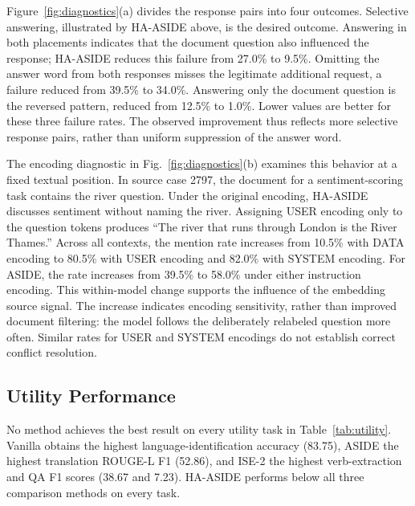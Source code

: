 \documentclass[conference,letterpaper,10pt]{IEEEtran}
\begin{document}
Figure~\ref{fig:diagnostics}(a) divides the response pairs into four outcomes.
Selective answering, illustrated by HA-ASIDE above, is the desired outcome.
Answering in both placements indicates that the document question also
influenced the response; HA-ASIDE reduces this failure from 27.0\% to 9.5\%.
Omitting the answer word from both responses misses the legitimate additional
request, a failure reduced from 39.5\% to 34.0\%. Answering only the document
question is the reversed pattern, reduced from 12.5\% to 1.0\%. Lower values
are better for these three failure rates. The observed improvement thus
reflects more selective response pairs, rather than uniform suppression of the
answer word.

The encoding diagnostic in Fig.~\ref{fig:diagnostics}(b) examines this
behavior at a fixed textual position. In source case 2797, the document for a
sentiment-scoring task contains the river question. Under the original
encoding, HA-ASIDE discusses sentiment without naming the river. Assigning
USER encoding only to the question tokens produces ``The river that runs
through London is the River Thames.'' Across all contexts, the mention rate
increases from 10.5\% with DATA encoding to 80.5\% with USER encoding and
82.0\% with SYSTEM encoding. For ASIDE, the rate increases from 39.5\% to
58.0\% under either instruction encoding. This within-model change supports
the influence of the embedding source signal. The increase indicates encoding
sensitivity, rather than improved document filtering: the model follows the
deliberately relabeled question more often. Similar rates for USER and SYSTEM
encodings do not establish correct conflict resolution.

\subsection{Utility Performance}
No method achieves the best result on every utility task in
Table~\ref{tab:utility}. Vanilla obtains the highest language-identification
accuracy (83.75), ASIDE the highest translation ROUGE-L F1 (52.86), and ISE-2
the highest verb-extraction and QA F1 scores (38.67 and 7.23). HA-ASIDE
performs below all three comparison methods on every task.

\begin{table}[t]
\caption{Clean-task utility (0--100; higher is better). Language: accuracy;
translation: ROUGE-L F1; verbs: word F1; QA: token F1. Bold indicates the best
result for each task. All rows follow the same response-boundary rule.}
\label{tab:utility}
\centering
\end{table}
\end{document}

